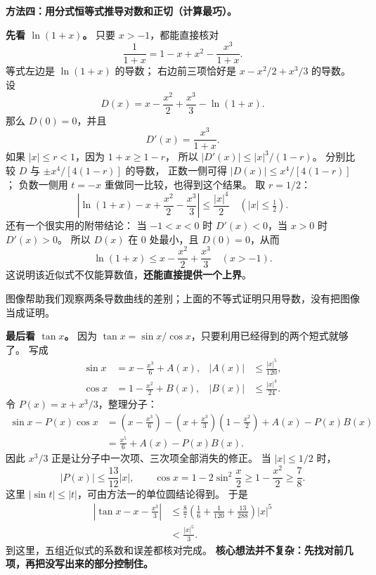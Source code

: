 \clearpage
\begin{proofbox}
\textbf{方法四：用分式恒等式推导对数和正切（计算最巧）。}

\textbf{先看 $\ln(1+x)$。}
只要 $x>-1$，都能直接核对
\[
 \frac{1}{1+x}=1-x+x^2-\frac{x^3}{1+x}.
\]
等式左边是 $\ln(1+x)$ 的导数；
右边前三项恰好是 $x-x^2/2+x^3/3$ 的导数。
设
\[
 D(x)=x-\frac{x^2}{2}+\frac{x^3}{3}-\ln(1+x).
\]
那么 $D(0)=0$，并且
\[
 D'(x)=\frac{x^3}{1+x}.
\]
如果 $|x|\le r<1$，因为 $1+x\ge1-r$，
所以 $|D'(x)|\le|x|^3/(1-r)$。
分别比较 $D$ 与 $\pm x^4/[4(1-r)]$ 的导数，
正数一侧可得
$|D(x)|\le x^4/[4(1-r)]$；
负数一侧用 $t=-x$ 重做同一比较，也得到这个结果。
取 $r=1/2$：
\[
 \boxed{\left|\ln(1+x)-x+\frac{x^2}{2}-\frac{x^3}{3}\right|
 \le\frac{|x|^4}{2}\quad(|x|\le\tfrac12)}.
\]
还有一个很实用的附带结论：
当 $-1<x<0$ 时 $D'(x)<0$，当 $x>0$ 时 $D'(x)>0$。
所以 $D(x)$ 在 $0$ 处最小，且 $D(0)=0$，从而
\[
 \boxed{\ln(1+x)\le x-\frac{x^2}{2}+\frac{x^3}{3}\quad(x>-1)}.
\]
这说明该近似式不仅能算数值，\textbf{还能直接提供一个上界}。

图像帮助我们观察两条导数曲线的差别；上面的不等式证明只用导数，没有把图像当成证明。

\textbf{最后看 $\tan x$。}
因为 $\tan x=\sin x/\cos x$，只要利用已经得到的两个短式就够了。
写成
\[
 \begin{aligned}
 \sin x&=x-\frac{x^3}{6}+A(x),& |A(x)|&\le\frac{|x|^5}{120},\\
 \cos x&=1-\frac{x^2}{2}+B(x),& |B(x)|&\le\frac{|x|^4}{24}.
 \end{aligned}
\]
令 $P(x)=x+x^3/3$，整理分子：
\[
\begin{aligned}
\sin x-P(x)\cos x
&=\left(x-\frac{x^3}{6}\right)
 -\left(x+\frac{x^3}{3}\right)\left(1-\frac{x^2}{2}\right)
 +A(x)-P(x)B(x)\\
&=\frac{x^5}{6}+A(x)-P(x)B(x).
\end{aligned}
\]
因此 $x^3/3$ 正是让分子中一次项、三次项全部消失的修正。
当 $|x|\le1/2$ 时，
\[
 |P(x)|\le\frac{13}{12}|x|,\qquad
 \cos x=1-2\sin^2\frac x2\ge1-\frac{x^2}{2}\ge\frac78.
\]
这里 $|\sin t|\le|t|$，可由方法一的单位圆结论得到。
于是
\[
\begin{aligned}
\left|\tan x-x-\frac{x^3}{3}\right|
&\le\frac87\left(\frac16+\frac1{120}+\frac{13}{288}\right)|x|^5\\
&<\boxed{\frac{|x|^5}{3}}.
\end{aligned}
\]
到这里，五组近似式的系数和误差都核对完成。
\textbf{核心想法并不复杂：先找对前几项，再把没写出来的部分控制住。}
\end{proofbox}
